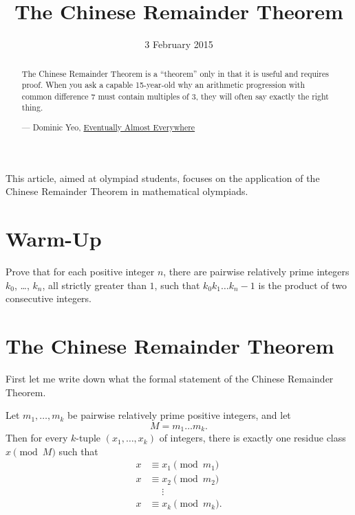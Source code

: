 \documentclass[11pt]{scrartcl}
\begin{document}
\title{The Chinese Remainder Theorem}
\date{3 February 2015}

\maketitle

\begin{abstract}
  \sffamily\small
  The Chinese Remainder Theorem is a ``theorem'' only in that it is useful and requires proof.
  When you ask a capable 15-year-old why an arithmetic progression with
  common difference $7$ must contain multiples of $3$, they will often say exactly the right thing.

  \medskip

  --- Dominic Yeo,
  \href{https://eventuallyalmosteverywhere.wordpress.com/2012/12/22/how-to-prove-fermats-little-theorem/}{Eventually Almost Everywhere}
\end{abstract}

This article, aimed at olympiad students, focuses on the application of the
Chinese Remainder Theorem in mathematical olympiads.

\section{Warm-Up}
\begin{problem}
  [USAMO 2008/1]
  Prove that for each positive integer $n$,
  there are pairwise relatively prime integers $k_0$, \dots, $k_n$,
  all strictly greater than $1$, such that
  $k_0k_1 \dots k_n - 1$ is the product of two consecutive integers.
\end{problem}

\section{The Chinese Remainder Theorem}
First let me write down what the formal statement of the Chinese Remainder Theorem.

\begin{theorem}
  Let $m_1, \dots, m_k$ be pairwise relatively prime positive integers, and let \[ M = m_1 \dots m_k. \]
  Then for every $k$-tuple $(x_1, \dots, x_k)$ of integers,
  there is exactly one residue class $x \pmod M$ such that
  \begin{align*}
    x &\equiv x_1 \pmod{m_1} \\
    x &\equiv x_2 \pmod{m_2} \\
    &\phantom\equiv\vdots \\
    x &\equiv x_k \pmod{m_k}.
  \end{align*}
\end{theorem}
\end{document}
